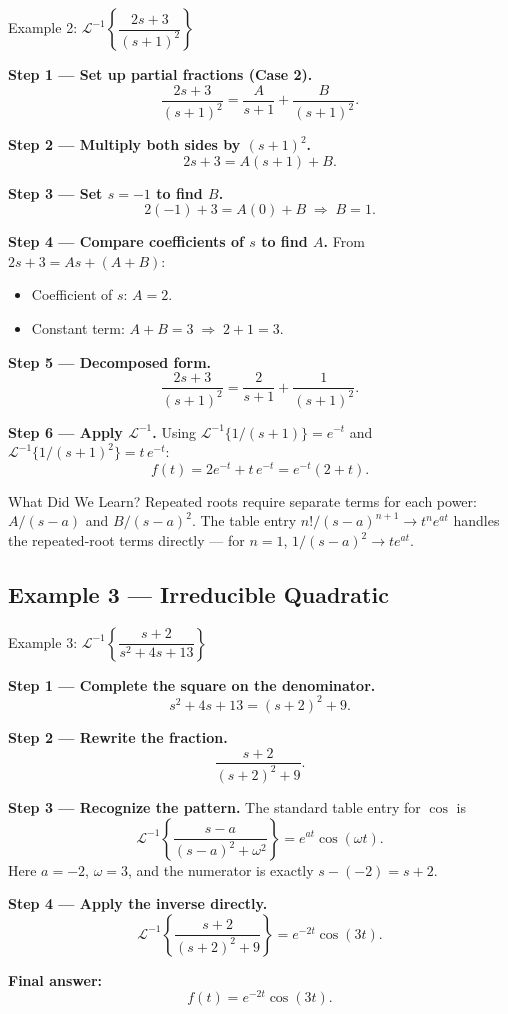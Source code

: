 \documentclass[12pt,a4paper]{article}
\begin{document}
\begin{infobox}{Example 2: $\mathcal{L}^{-1}\!\left\{\dfrac{2s+3}{(s+1)^{2}}\right\}$}

\textbf{Step 1 --- Set up partial fractions (Case 2).}
\[
    \frac{2s+3}{(s+1)^{2}} = \frac{A}{s+1} + \frac{B}{(s+1)^{2}}.
\]

\textbf{Step 2 --- Multiply both sides by $(s+1)^{2}$.}
\[
    2s+3 = A(s+1) + B.
\]

\textbf{Step 3 --- Set $s = -1$ to find $B$.}
\[
    2(-1)+3 = A(0) + B \;\Rightarrow\; B = 1.
\]

\textbf{Step 4 --- Compare coefficients of $s$ to find $A$.}
From $2s + 3 = As + (A + B)$:
\begin{itemize}
    \item Coefficient of $s$: $A = 2$.
    \item Constant term: $A + B = 3 \;\Rightarrow\; 2 + 1 = 3$. \checkmark
\end{itemize}

\textbf{Step 5 --- Decomposed form.}
\[
    \frac{2s+3}{(s+1)^{2}} = \frac{2}{s+1} + \frac{1}{(s+1)^{2}}.
\]

\textbf{Step 6 --- Apply $\mathcal{L}^{-1}$.}
Using $\mathcal{L}^{-1}\{1/(s+1)\} = e^{-t}$ and
$\mathcal{L}^{-1}\{1/(s+1)^{2}\} = t\,e^{-t}$:
\[
    \boxed{f(t) = 2e^{-t} + t\,e^{-t} = e^{-t}(2+t).}
\]
\end{infobox}

\begin{learnbox}{What Did We Learn?}
Repeated roots require separate terms for each power: $A/(s-a)$ and
$B/(s-a)^{2}$.  The table entry $n!/(s-a)^{n+1} \to t^{n}e^{at}$ handles
the repeated-root terms directly --- for $n=1$, $1/(s-a)^{2} \to te^{at}$.
\end{learnbox}

\subsection{Example 3 --- Irreducible Quadratic}

\begin{infobox}{Example 3: $\mathcal{L}^{-1}\!\left\{\dfrac{s+2}{s^{2}+4s+13}\right\}$}

\textbf{Step 1 --- Complete the square on the denominator.}
\[
    s^{2}+4s+13 = (s+2)^{2}+9.
\]

\textbf{Step 2 --- Rewrite the fraction.}
\[
    \frac{s+2}{(s+2)^{2}+9}.
\]

\textbf{Step 3 --- Recognize the pattern.}
The standard table entry for $\cos$ is
\[
    \mathcal{L}^{-1}\!\left\{\frac{s-a}{(s-a)^{2}+\omega^{2}}\right\} = e^{at}\cos(\omega t).
\]
Here $a = -2$, $\omega = 3$, and the numerator is exactly $s - (-2) = s+2$.

\textbf{Step 4 --- Apply the inverse directly.}
\[
    \mathcal{L}^{-1}\!\left\{\frac{s+2}{(s+2)^{2}+9}\right\} = e^{-2t}\cos(3t).
\]

\textbf{Final answer:}
\[
    \boxed{f(t) = e^{-2t}\cos(3t).}
\]
\end{infobox}
\end{document}
